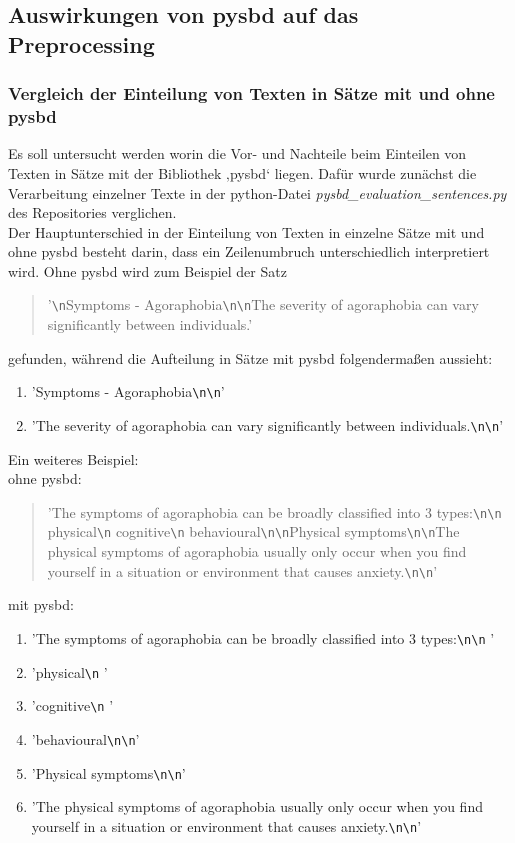 \subsection{Auswirkungen von pysbd auf das Preprocessing}

\subsubsection{Vergleich der Einteilung von Texten in Sätze mit und ohne pysbd}
Es soll untersucht werden worin die Vor- und Nachteile beim Einteilen von Texten in Sätze mit der Bibliothek ‚pysbd‘ liegen. Dafür wurde zunächst die Verarbeitung einzelner Texte in der python-Datei \emph{pysbd\_evaluation\_sentences.py} des Repositories verglichen.\\

Der Hauptunterschied in der Einteilung von Texten in einzelne Sätze mit und ohne pysbd besteht darin, dass ein Zeilenumbruch unterschiedlich interpretiert wird.
Ohne pysbd wird zum Beispiel der Satz

\begin{quotation}
	'\verb!\n!Symptoms - Agoraphobia\verb!\n!\verb!\n!The severity of agoraphobia can vary significantly between individuals.'
\end{quotation}

gefunden, während die Aufteilung in Sätze mit pysbd folgendermaßen aussieht:

\begin{enumerate}
	\item 'Symptoms - Agoraphobia\verb!\n!\verb!\n!'
	\item 'The severity of agoraphobia can vary significantly between individuals.\verb!\n!\verb!\n!'
\end{enumerate}

Ein weiteres Beispiel:\\

ohne pysbd: 
\begin{quotation}
	'The symptoms of agoraphobia can be broadly classified into 3 types:\verb!\n!\verb!\n!    physical\verb!\n!    cognitive\verb!\n!    behavioural\verb!\n!\verb!\n!Physical symptoms\verb!\n!\verb!\n!The physical symptoms of agoraphobia usually only occur when you find yourself in a situation or environment that causes anxiety.\verb!\n!\verb!\n!'
\end{quotation}

mit pysbd:
\begin{enumerate}
	\item 'The symptoms of agoraphobia can be broadly classified into 3 types:\verb!\n!\verb!\n!    '
	\item 'physical\verb!\n!    '
	\item 'cognitive\verb!\n!    '
	\item 'behavioural\verb!\n!\verb!\n!'
	\item 'Physical symptoms\verb!\n!\verb!\n!'
	\item 'The physical symptoms of agoraphobia usually only occur when you find yourself in a situation or environment that causes anxiety.\verb!\n!\verb!\n!'
\end{enumerate}

